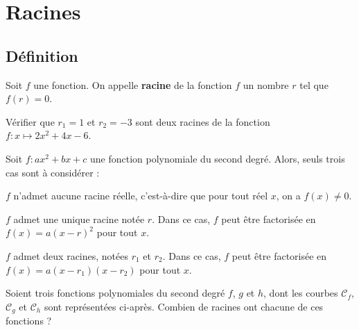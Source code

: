 \documentclass{poly}
\begin{document}
\newpage

\section{Racines}

\subsection{Définition}

\begin{tcolorbox}
\begin{definition}
Soit $f$ une fonction. On appelle \textbf{racine} de la fonction $f$ un nombre $r$ tel que $f(r) = 0$.
\end{definition}
\end{tcolorbox}
\begin{example}
Vérifier que $r_1 = 1$ et $r_2 = - 3$ sont deux racines de la fonction $f : x \mapsto 2x^2 + 4x - 6$.
\vspace*{0.2cm}

\end{example}
\begin{proposition}
Soit $f : ax^2 + bx + c$ une fonction polynomiale du second degré. Alors, seuls trois cas sont à considérer :
\begin{alphaquestions}
\item $f$ n'admet aucune racine réelle, c'est-à-dire que pour tout réel $x$, on a $f(x) \neq 0$.
\item $f$ admet une unique racine notée $r$. Dans ce cas, $f$ peut être factorisée en $f(x) = a (x - r)^2$ pour tout $x$.
\item $f$ admet deux racines, notées $r_1$ et $r_2$. Dans ce cas, $f$ peut être factorisée en $f(x) = a(x - r_1)(x - r_2)$ pour tout $x$.    
\end{alphaquestions} 
\end{proposition}
\begin{example}
Soient trois fonctions polynomiales du second degré $f$, $g$ et $h$, dont les courbes $\mathcal{C}_f$, $\mathcal{C}_g$ et $\mathcal{C}_h$ sont représentées ci-après. Combien de racines ont chacune de ces fonctions ?
\begin{center}
\end{center}
\end{example}
\newpage
\end{document}
